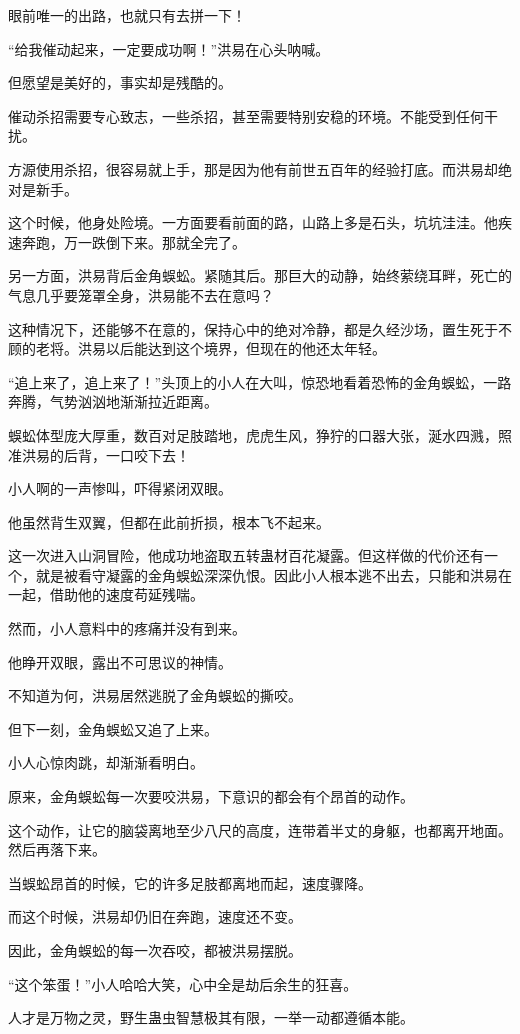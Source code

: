 \begin{this_body}
眼前唯一的出路，也就只有去拼一下！

“给我催动起来，一定要成功啊！”洪易在心头呐喊。

但愿望是美好的，事实却是残酷的。

催动杀招需要专心致志，一些杀招，甚至需要特别安稳的环境。不能受到任何干扰。

方源使用杀招，很容易就上手，那是因为他有前世五百年的经验打底。而洪易却绝对是新手。

这个时候，他身处险境。一方面要看前面的路，山路上多是石头，坑坑洼洼。他疾速奔跑，万一跌倒下来。那就全完了。

另一方面，洪易背后金角蜈蚣。紧随其后。那巨大的动静，始终萦绕耳畔，死亡的气息几乎要笼罩全身，洪易能不去在意吗？

这种情况下，还能够不在意的，保持心中的绝对冷静，都是久经沙场，置生死于不顾的老将。洪易以后能达到这个境界，但现在的他还太年轻。

“追上来了，追上来了！”头顶上的小人在大叫，惊恐地看着恐怖的金角蜈蚣，一路奔腾，气势汹汹地渐渐拉近距离。

蜈蚣体型庞大厚重，数百对足肢踏地，虎虎生风，狰狞的口器大张，涎水四溅，照准洪易的后背，一口咬下去！

小人啊的一声惨叫，吓得紧闭双眼。

他虽然背生双翼，但都在此前折损，根本飞不起来。

这一次进入山洞冒险，他成功地盗取五转蛊材百花凝露。但这样做的代价还有一个，就是被看守凝露的金角蜈蚣深深仇恨。因此小人根本逃不出去，只能和洪易在一起，借助他的速度苟延残喘。

然而，小人意料中的疼痛并没有到来。

他睁开双眼，露出不可思议的神情。

不知道为何，洪易居然逃脱了金角蜈蚣的撕咬。

但下一刻，金角蜈蚣又追了上来。

小人心惊肉跳，却渐渐看明白。

原来，金角蜈蚣每一次要咬洪易，下意识的都会有个昂首的动作。

这个动作，让它的脑袋离地至少八尺的高度，连带着半丈的身躯，也都离开地面。然后再落下来。

当蜈蚣昂首的时候，它的许多足肢都离地而起，速度骤降。

而这个时候，洪易却仍旧在奔跑，速度还不变。

因此，金角蜈蚣的每一次吞咬，都被洪易摆脱。

“这个笨蛋！”小人哈哈大笑，心中全是劫后余生的狂喜。

人才是万物之灵，野生蛊虫智慧极其有限，一举一动都遵循本能。


\end{this_body}
